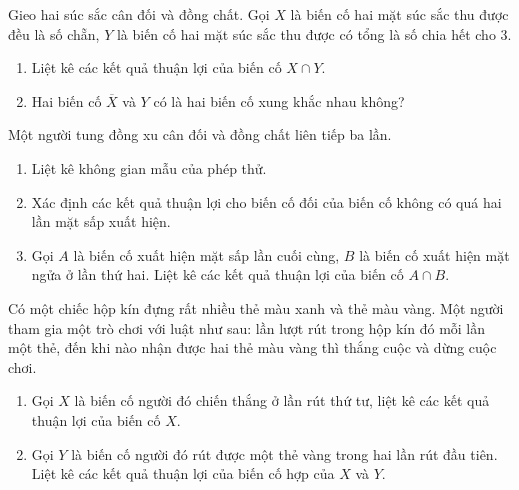 \begin{bt}%
Gieo hai súc sắc cân đối và đồng chất. Gọi $X$ là biến cố hai mặt súc sắc thu được đều là số chẵn, $Y$ là biến cố hai mặt súc sắc thu được có tổng là số chia hết cho $3$.
\begin{enumerate}
	\item Liệt kê các kết quả thuận lợi của biến cố $X\cap Y$.
	\item Hai biến cố $\overline{X}$ và $Y$ có là hai biến cố xung khắc nhau không?
\end{enumerate}
\end{bt}
\begin{bt}%
Một người tung đồng xu cân đối và đồng chất liên tiếp ba lần.
\begin{enumerate}
	\item Liệt kê không gian mẫu của phép thử.
	\item Xác định các kết quả thuận lợi cho biến cố đối của biến cố không có quá hai lần mặt sấp xuất hiện.
	\item Gọi $A$ là biến cố xuất hiện mặt sấp lần cuối cùng, $B$ là biến cố xuất hiện mặt ngửa ở lần thứ hai. Liệt kê các kết quả thuận lợi của biến cố $A\cap B$.
\end{enumerate}
\end{bt}
\begin{bt}%
Có một chiếc hộp kín đựng rất nhiều thẻ màu xanh và thẻ màu vàng.	Một người tham gia một trò chơi với luật như sau: lần lượt rút trong hộp kín đó mỗi lần một thẻ, đến khi nào nhận được hai thẻ màu vàng thì thắng cuộc và dừng cuộc chơi.
\begin{enumerate}
	\item Gọi $X$ là biến cố người đó chiến thắng ở lần rút thứ tư, liệt kê các kết quả thuận lợi của biến cố $X$.
	\item Gọi $Y$ là biến cố người đó rút được một thẻ vàng trong hai lần rút đầu tiên. Liệt kê các kết quả thuận lợi của biến cố hợp của $X$ và $Y$.
\end{enumerate} 
\end{bt}
